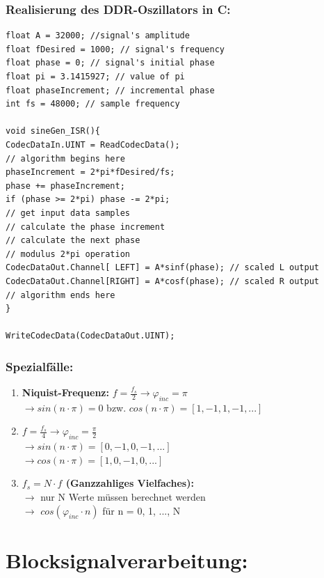\documentclass[10pt,a4paper]{article}
\begin{document}
\subsubsection{Realisierung des DDR-Oszillators in C:}
\begin{verbatim}
float A = 32000; //signal's amplitude 
float fDesired = 1000; // signal's frequency 
float phase = 0; // signal's initial phase 
float pi = 3.1415927; // value of pi 
float phaseIncrement; // incremental phase 
int fs = 48000; // sample frequency 

void sineGen_ISR(){
CodecDataIn.UINT = ReadCodecData();
// algorithm begins here 
phaseIncrement = 2*pi*fDesired/fs;
phase += phaseIncrement;
if (phase >= 2*pi) phase -= 2*pi;
// get input data samples
// calculate the phase increment 
// calculate the next phase 
// modulus 2*pi operation 
CodecDataOut.Channel[ LEFT] = A*sinf(phase); // scaled L output 
CodecDataOut.Channel[RIGHT] = A*cosf(phase); // scaled R output 
// algorithm ends here 
}

WriteCodecData(CodecDataOut.UINT);
\end{verbatim}


\subsubsection{Spezialfälle:}
\begin{enumerate}
  \item \textbf{Niquist-Frequenz: }$f=\frac{f_s}{2} \rightarrow \varphi_{inc} = \pi$\\
  $\rightarrow sin(n\cdot\pi) = 0$ bzw. $cos(n\cdot\pi) = [1, -1, 1, -1, ...]$
  \item $f=\frac{f_s}{4} \rightarrow \varphi_{inc} = \frac{\pi}{2}$\\
  $\rightarrow sin(n\cdot\pi) = [0, -1, 0, -1, ...]$\\ 
  $\rightarrow cos(n\cdot\pi) = [1, 0, -1, 0, ...]$
  \item \textbf{$f_s= N \cdot f$ (Ganzzahliges Vielfaches):} \\
  $\rightarrow$ nur N Werte müssen berechnet werden\\
  $\rightarrow$ $cos(\varphi_{inc}\cdot n)$ für n = 0, 1, ..., N
 
\end{enumerate}

\section{Blocksignalverarbeitung:}
\end{document}
